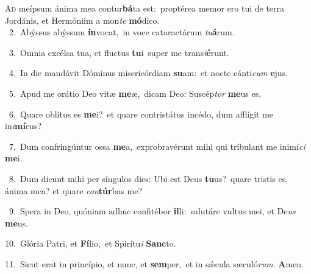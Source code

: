 \lettrine{\initial\textcolor{\initialcolor}{A}}{d} meípsum ánima mea contur\-\textbf{bá}\-ta est:~\star proptérea memor ero tui de terra Jordánis, et Hermóniim a mon\textit{te} \textbf{mó}\-dico.\\
{\numbfont\textcolor{\numbcolor}{~2.}}~Abýssus abýssum \textbf{ín}\-vocat,~\star in voce cataractárum \textit{tu}\-\textbf{á}rum.\par
{\numbfont\textcolor{\numbcolor}{~3.}}~Omnia excélsa tua, et fluctus \textbf{tu}\-i~\star super me trans\-\textit{i}\-\textbf{é}runt.\par
{\numbfont\textcolor{\numbcolor}{~4.}}~In die mandávit Dóminus misericórdiam \textbf{su}\-am:~\star et nocte cánti\textit{cum} \textbf{e}\-jus.\par
{\numbfont\textcolor{\numbcolor}{~5.}}~Apud me orátio Deo vitæ \textbf{me}\-æ,~\star dicam Deo: Suscép\textit{tor} \textbf{me}\-us es.\par
{\numbfont\textcolor{\numbcolor}{~6.}}~Quare oblítus es \textbf{me}\-i?~\star et quare contristátus incédo, dum afflígit me in\-\textit{i}\-\textbf{mí}cus?\par
{\numbfont\textcolor{\numbcolor}{~7.}}~Dum confringúntur ossa \textbf{me}\-a,~\star exprobravérunt mihi qui tríbulant me inimí\textit{ci} \textbf{me}\-i.\par
{\numbfont\textcolor{\numbcolor}{~8.}}~Dum dicunt mihi per síngulos dies: Ubi est Deus \textbf{tu}\-us?~\star quare tristis es, ánima mea? et quare \textit{con}\-\textbf{túr}bas me?\par
{\numbfont\textcolor{\numbcolor}{~9.}}~Spera in Deo, quóniam adhuc confitébor \textbf{il}\-li:~\star salutáre vultus mei, et De\textit{us} \textbf{me}\-us.\par
{\numbfont\textcolor{\numbcolor}{10.}}~Glória Patri, et \textbf{Fí}\-lio,~\star et Spirítu\textit{i} \textbf{Sanc}\-to.\par
{\numbfont\textcolor{\numbcolor}{11.}}~Sicut erat in princípio, et nunc, et \textbf{sem}\-per,~\star et in sǽcula sæculó\-\textit{rum}\-. \textbf{A}\-men.\par
